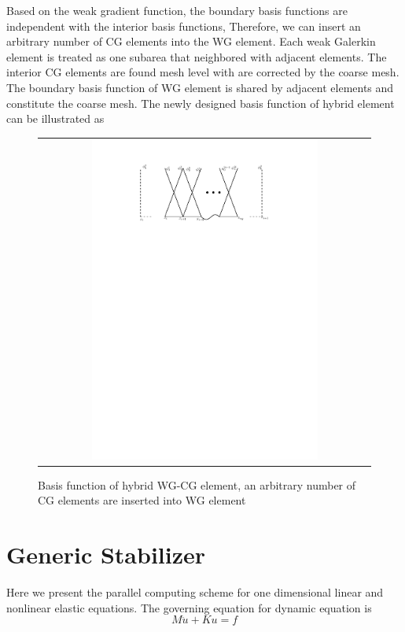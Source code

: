 Based on the weak gradient function, the boundary basis functions are independent with the interior basis functions, Therefore, we can insert an arbitrary number of CG elements into the WG element. Each weak Galerkin element is treated as one subarea that neighbored with adjacent elements. The interior CG elements are found mesh level with are corrected by the coarse mesh. The boundary basis function of WG element is shared by adjacent elements and constitute the coarse mesh. The newly designed basis function of hybrid element can be illustrated as

\begin{figure}[h]
	\centering
	\begin{tabular}{c}
		\includegraphics[width=0.7\textwidth]{./pics/hybrid}
	\end{tabular}
	\caption{\footnotesize Basis function of hybrid WG-CG element, an arbitrary number of CG elements are inserted into WG element}
\end{figure}

\section{Generic Stabilizer}
Here we present the parallel computing scheme for one dimensional linear and nonlinear elastic equations. The governing equation for dynamic equation is 
\begin{equation}
M\ddot{u} + Ku = f
\end{equation}


